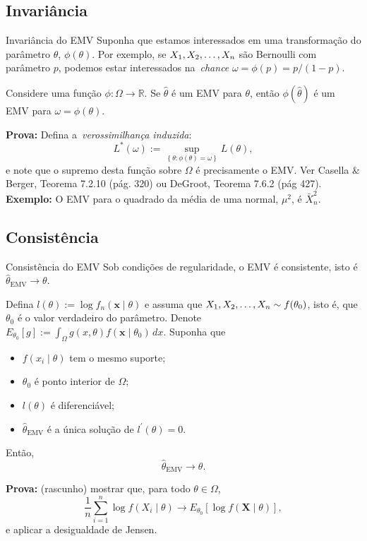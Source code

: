 \subsection*{Invariância} 
\begin{frame}{Invariância do EMV}
Suponha que estamos interessados em uma transformação do parâmetro $\theta$, $\phi(\theta)$.
Por exemplo, se $X_1, X_2, \ldots, X_n$ são Bernoulli com parâmetro $p$,  podemos estar interessados na~\textit{chance} $\omega = \phi(p) = p/(1-p)$.
\begin{theo}
\label{thm:invariance_MLE}
 Considere uma função $\phi : \Omega \to \mathbb{R}$.
 Se $\hat{\theta}$ é um EMV para $\theta$, então $\phi(\hat{\theta})$ é um EMV para $\omega = \phi(\theta)$.
\end{theo}
\textbf{Prova:} Defina a~\textit{verossimilhança induzida}:
\[ L^\ast(\omega) := \sup_{\left\{ \theta: \phi(\theta) = \omega \right\}} L(\theta), \]
e note que o supremo desta função sobre $\Omega$ é precisamente o EMV.
Ver Casella \& Berger, Teorema 7.2.10 (pág. 320) ou DeGroot, Teorema 7.6.2 (pág 427).
\textbf{Exemplo:} O EMV para o quadrado da média de uma normal, $\mu^2$, é $\bar{X}_n^2$.
\end{frame}

\subsection*{Consistência} 

\begin{frame}{Consistência do EMV}
Sob condições de regularidade, o EMV é consistente, isto é $\hat{\theta}_{\text{EMV}} \xrightarrow{} \theta$.
\begin{theo}
\label{thm:consistency_MLE}
Defina $l(\theta) := \log f_n(\boldsymbol{x} \mid \theta)$ e assuma que $X_1, X_2, \ldots, X_n \sim f(\theta_0)$, isto é, que $\theta_0$ é o valor verdadeiro do parâmetro.
Denote $E_{\theta_0}[g] := \int_{\Omega} g(x, \theta) f(\boldsymbol{x} \mid \theta_0)\, dx$.
 Suponha que 
 \begin{itemize}
  \item $f(x_i \mid \theta)$ tem o mesmo suporte;
  \item $\theta_0$ é ponto interior de $\Omega$;
  \item $l(\theta)$ é diferenciável;
  \item $\hat{\theta}_{\text{EMV}}$ é a única solução de $l^\prime(\theta) = 0$.
 \end{itemize}
   Então,
  $$\hat{\theta}_{\text{EMV}} \xrightarrow{} \theta.$$
\end{theo}
\textbf{Prova:} (rascunho) mostrar que, para todo $\theta \in \Omega$,
\[ \frac{1}{n} \sum_{i=1}^n \log f(X_i \mid \theta) \xrightarrow{} E_{\theta_0}\left[ \log f(\boldsymbol{X} \mid \theta) \right], \]
e aplicar a desigualdade de Jensen.
\end{frame}


